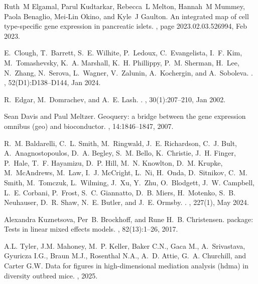 \documentclass[
]{article}
\begin{document}
\begin{thebibliography}{100}
Ruth~M Elgamal, Parul Kudtarkar, Rebecca~L Melton, Hannah~M Mummey, Paola
  Benaglio, Mei-Lin Okino, and Kyle~J Gaulton.
\newblock An integrated map of cell type-specific gene expression in pancreatic
  islets.
, page 2023.02.03.526994, Feb 2023.

E.~Clough, T.~Barrett, S.~E. Wilhite, P.~Ledoux, C.~Evangelista, I.~F. Kim,
  M.~Tomashevsky, K.~A. Marshall, K.~H. Phillippy, P.~M. Sherman, H.~Lee,
  N.~Zhang, N.~Serova, L.~Wagner, V.~Zalunin, A.~Kochergin, and A.~Soboleva.
.
, 52(D1):D138--D144, Jan 2024.

R.~Edgar, M.~Domrachev, and A.~E. Lash.
.
, 30(1):207--210, Jan 2002.

Sean Davis and Paul Meltzer.
\newblock Geoquery: a bridge between the gene expression omnibus (geo) and
  bioconductor.
, 14:1846--1847, 2007.

R.~M. Baldarelli, C.~L. Smith, M.~Ringwald, J.~E. Richardson, C.~J. Bult,
  A.~Anagnostopoulos, D.~A. Begley, S.~M. Bello, K.~Christie, J.~H. Finger,
  P.~Hale, T.~F. Hayamizu, D.~P. Hill, M.~N. Knowlton, D.~M. Krupke,
  M.~McAndrews, M.~Law, I.~J. McCright, L.~Ni, H.~Onda, D.~Sitnikov, C.~M.
  Smith, M.~Tomczuk, L.~Wilming, J.~Xu, Y.~Zhu, O.~Blodgett, J.~W. Campbell,
  L.~E. Corbani, P.~Frost, S.~C. Giannatto, D.~B. Miers, H.~Motenko, S.~B.
  Neuhauser, D.~R. Shaw, N.~E. Butler, and J.~E. Ormsby.
.
, 227(1), May 2024.

Alexandra Kuznetsova, Per~B. Brockhoff, and Rune H.~B. Christensen.
 package: Tests in linear mixed effects models.
, 82(13):1--26, 2017.

A.L. Tyler, J.M. Mahoney, M.~P. Keller, Baker C.N., Gaca M., A.~Srivastava,
  Gyuricza I.G., Braun M.J., Rosenthal N.A., A.~D. Attie, G.~A. Churchill, and
  Carter G.W.
\newblock Data for figures in high-dimensional mediation analysis (hdma) in
  diversity outbred mice.
, 2025.

\end{thebibliography}
\end{document}
